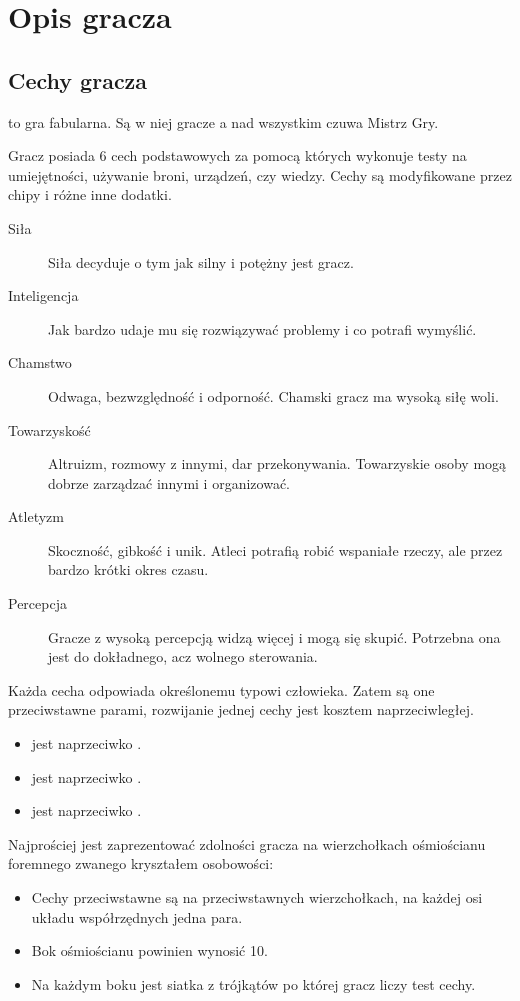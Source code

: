 \chapter{Opis gracza}
\section{Cechy gracza}
\kosmoramus to gra fabularna. Są w niej gracze a nad wszystkim czuwa Mistrz Gry.

Gracz posiada 6 cech podstawowych za pomocą których wykonuje testy na umiejętności, używanie broni, urządzeń, czy wiedzy.
Cechy są modyfikowane przez chipy i różne inne dodatki.
\begin{description}
 \item[Siła \abs] Siła decyduje o tym jak silny i potężny jest gracz.
 \item[Inteligencja \abi] Jak bardzo udaje mu się rozwiązywać problemy i co potrafi wymyślić.
 \item[Chamstwo \abh] Odwaga, bezwzględność i odporność. Chamski gracz ma wysoką siłę woli.
 \item[Towarzyskość \abt] Altruizm, rozmowy z innymi, dar przekonywania. Towarzyskie osoby mogą dobrze zarządzać innymi i organizować.
 \item[Atletyzm \aba] Skoczność, gibkość i unik. Atleci potrafią robić wspaniałe rzeczy, ale przez bardzo krótki okres czasu.
 \item[Percepcja \abp] Gracze z wysoką percepcją widzą więcej i mogą się skupić. Potrzebna ona jest do dokładnego, acz wolnego sterowania.
\end{description}

Każda cecha odpowiada określonemu typowi człowieka.
Zatem są one przeciwstawne parami, rozwijanie jednej cechy jest kosztem naprzeciwległej.
\begin{itemize}
 \item \abs jest naprzeciwko \abi.
 \item \abh jest naprzeciwko \abt.
 \item \aba jest naprzeciwko \abp.
\end{itemize}

Najprościej jest zaprezentować zdolności gracza na wierzchołkach ośmiościanu foremnego zwanego kryształem osobowości:
\begin{itemize}
 \item Cechy przeciwstawne są na przeciwstawnych wierzchołkach, na każdej osi układu współrzędnych jedna para.
 \item Bok ośmiościanu powinien wynosić 10.
 \item Na każdym boku jest siatka z trójkątów po której gracz liczy test cechy.
\end{itemize}

